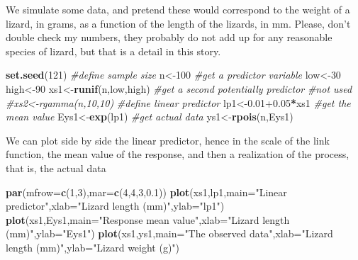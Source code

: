\documentclass[
]{book}
\newenvironment{Shaded}{\begin{snugshade}}{\end{snugshade}}
\newcommand{\AttributeTok}[1]{\textcolor[rgb]{0.13,0.29,0.53}{#1}}
\newcommand{\CommentTok}[1]{\textcolor[rgb]{0.56,0.35,0.01}{\textit{#1}}}
\newcommand{\DecValTok}[1]{\textcolor[rgb]{0.00,0.00,0.81}{#1}}
\newcommand{\FloatTok}[1]{\textcolor[rgb]{0.00,0.00,0.81}{#1}}
\newcommand{\FunctionTok}[1]{\textcolor[rgb]{0.13,0.29,0.53}{\textbf{#1}}}
\newcommand{\NormalTok}[1]{#1}
\newcommand{\OtherTok}[1]{\textcolor[rgb]{0.56,0.35,0.01}{#1}}
\newcommand{\SpecialCharTok}[1]{\textcolor[rgb]{0.81,0.36,0.00}{\textbf{#1}}}
\newcommand{\StringTok}[1]{\textcolor[rgb]{0.31,0.60,0.02}{#1}}
\begin{document}
We simulate some data, and pretend these would correspond to the weight of a lizard, in grams, as a function of the length of the lizards, in mm. Please, don't double check my numbers, they probably do not add up for any reasonable species of lizard, but that is a detail in this story.

\begin{Shaded}
\begin{Highlighting}[]
\FunctionTok{set.seed}\NormalTok{(}\DecValTok{121}\NormalTok{)}
\CommentTok{\#define sample size}
\NormalTok{n}\OtherTok{\textless{}{-}}\DecValTok{100}
\CommentTok{\#get a predictor variable}
\NormalTok{low}\OtherTok{\textless{}{-}}\DecValTok{30}
\NormalTok{high}\OtherTok{\textless{}{-}}\DecValTok{90}
\NormalTok{xs1}\OtherTok{\textless{}{-}}\FunctionTok{runif}\NormalTok{(n,low,high)}
\CommentTok{\#get a second potentially predictor}
\CommentTok{\#not used}
\CommentTok{\#xs2\textless{}{-}rgamma(n,10,10)}
\CommentTok{\#define linear predictor}
\NormalTok{lp1}\OtherTok{\textless{}{-}}\FloatTok{0.01+0.05}\SpecialCharTok{*}\NormalTok{xs1}
\CommentTok{\#get the mean value}
\NormalTok{Eys1}\OtherTok{\textless{}{-}}\FunctionTok{exp}\NormalTok{(lp1)}
\CommentTok{\#get actual data}
\NormalTok{ys1}\OtherTok{\textless{}{-}}\FunctionTok{rpois}\NormalTok{(n,Eys1)}
\end{Highlighting}
\end{Shaded}

We can plot side by side the linear predictor, hence in the scale of the link function, the mean value of the response, and then a realization of the process, that is, the actual data

\begin{Shaded}
\begin{Highlighting}[]
\FunctionTok{par}\NormalTok{(}\AttributeTok{mfrow=}\FunctionTok{c}\NormalTok{(}\DecValTok{1}\NormalTok{,}\DecValTok{3}\NormalTok{),}\AttributeTok{mar=}\FunctionTok{c}\NormalTok{(}\DecValTok{4}\NormalTok{,}\DecValTok{4}\NormalTok{,}\DecValTok{3}\NormalTok{,}\FloatTok{0.1}\NormalTok{))}
\FunctionTok{plot}\NormalTok{(xs1,lp1,}\AttributeTok{main=}\StringTok{"Linear predictor"}\NormalTok{,}\AttributeTok{xlab=}\StringTok{"Lizard length (mm)"}\NormalTok{,}\AttributeTok{ylab=}\StringTok{"lp1"}\NormalTok{)}
\FunctionTok{plot}\NormalTok{(xs1,Eys1,}\AttributeTok{main=}\StringTok{"Response mean value"}\NormalTok{,}\AttributeTok{xlab=}\StringTok{"Lizard length (mm)"}\NormalTok{,}\AttributeTok{ylab=}\StringTok{"Eys1"}\NormalTok{)}
\FunctionTok{plot}\NormalTok{(xs1,ys1,}\AttributeTok{main=}\StringTok{"The observed data"}\NormalTok{,}\AttributeTok{xlab=}\StringTok{"Lizard length (mm)"}\NormalTok{,}\AttributeTok{ylab=}\StringTok{"Lizard weight (g)"}\NormalTok{)}
\end{Highlighting}
\end{Shaded}
\end{document}
